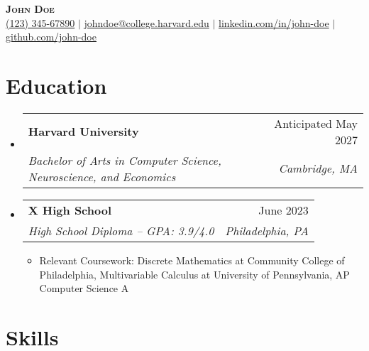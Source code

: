 \documentclass[letterpaper,11pt]{article}
\makeatletter
\newcommand{\resumeItem}[1]{
  \item\small{
    {#1 \vspace{-2pt}}
  }
}
\newcommand{\resumeSubheading}[4]{
  \vspace{-2pt}\item
    \begin{tabular*}{0.97\textwidth}[t]{l@{\extracolsep{\fill}}r}
      \textbf{#1} & #2 \\
      \small#3 & \small #4   \\
    \end{tabular*}\vspace{-7pt}
}
\newcommand{\resumeSubHeadingListStart}{\begin{itemize}[leftmargin=0.15in, label={}]}
\newcommand{\resumeSubHeadingListEnd}{\end{itemize}}
\newcommand{\resumeItemListStart}{\begin{itemize}}
\newcommand{\resumeItemListEnd}{\end{itemize}\vspace{-5pt}}
\makeatother
\begin{document}

\begin{center}
    \textbf{\Huge \scshape John Doe} \\ \vspace{1pt}
    \small \href{tel:12672693255}{(123) 345-67890} $|$ \href{mailto:dennycao@college.harvard.edu}{johndoe@college.harvard.edu} 
 $|$ \href{https://www.linkedin.com/in/denny-cao/}{linkedin.com/in/john-doe} $|$     \href{https://github.com/denny-cao}{github.com/john-doe}
\end{center}

\section{Education}
  \resumeSubHeadingListStart
    \resumeSubheading
      {Harvard University}{Anticipated May 2027}
      {\textit{Bachelor of Arts in Computer Science, Neuroscience, and Economics}}{\textit{Cambridge, MA}}
    \resumeSubheading
      {X High School}{June 2023}
      {\textit{High School Diploma -- GPA: 3.9/4.0}}{\textit{Philadelphia, PA}}
      \resumeItemListStart
        \resumeItem{Relevant Coursework: Discrete Mathematics at Community College of Philadelphia, Multivariable Calculus at University of Pennsylvania, AP Computer Science A}
      \resumeItemListEnd
  \resumeSubHeadingListEnd



\section{Skills}
\end{document}

